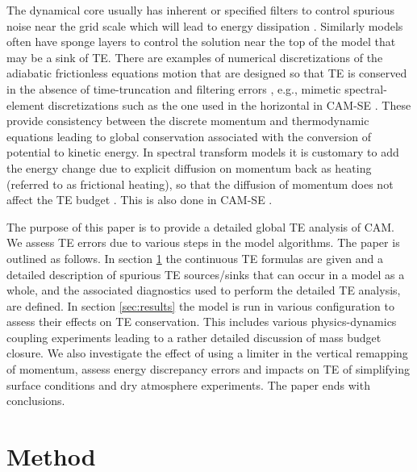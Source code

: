 \documentclass{agujournal}
\begin{document}
The dynamical core usually has inherent or specified filters to control spurious noise near the grid scale which will lead to energy dissipation \citep{T2008JCP,JW2010LNCSE}. Similarly models often have sponge layers to control the solution near the top of the model that may be a sink of TE. There are examples of numerical discretizations of the adiabatic frictionless equations motion that are designed so that TE is conserved in the absence of time-truncation and filtering errors \citep[e.g., ][]{ER2017GMD,MC2013QJRMS}, e.g., mimetic spectral-element discretizations such as the one used in the horizontal in CAM-SE \citep{T2011LNCSEb}. These provide consistency between the discrete momentum and thermodynamic equations leading to global conservation associated with the conversion of potential to kinetic energy. In spectral transform models it is customary to add the energy change due to explicit diffusion on momentum back as heating (referred to as frictional heating), so that the diffusion of momentum does not affect the TE budget \citep[see, e.g., p.71 in ][]{CAM5}. This is also done in CAM-SE \citep{LetAl2018JAMES}. 

The purpose of this paper is to provide a detailed global TE analysis of CAM. We assess TE errors due to various steps in the model algorithms. The paper is outlined as follows. In section \ref{sec:methods} the continuous TE formulas are given and a detailed description of spurious TE sources/sinks that can occur in a model as a whole, and the associated diagnostics used to perform the detailed TE analysis, are defined. In section \ref{sec:results} the model is run in various configuration to assess their effects on TE conservation. This includes various physics-dynamics coupling experiments leading to a rather detailed discussion of mass budget closure. We also investigate the effect of using a limiter in the vertical remapping of momentum, assess energy discrepancy errors and impacts on TE of simplifying surface conditions and dry atmosphere experiments. The paper ends with conclusions.



\section{Method}
\label{sec:methods}
\end{document}
